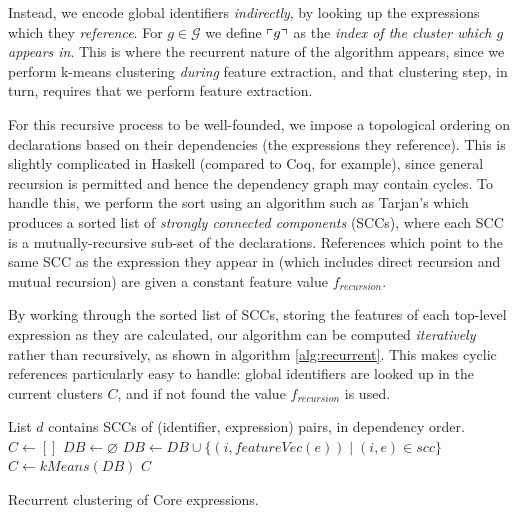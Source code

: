 \iffalse TODO: this is a novel feature compared to ML4PG, ACL2(ml), etc., right? Maybe... Emphasize either the connection to earlier work, or the novelty. \fi
Instead, we encode global identifiers \emph{indirectly}, by looking up the expressions which they \emph{reference}. For $g \in \mathcal{G}$ we define $\left\ulcorner g \right\urcorner$ as the \emph{index of the cluster which $g$ appears in}. This is where the recurrent nature of the algorithm appears, since we perform k-means clustering \emph{during} feature extraction, and that clustering step, in turn, requires that we perform feature extraction.

For this recursive process to be well-founded, we impose a topological ordering on declarations based on their dependencies (the expressions they reference). \iffalse TODO: Maybe explain a little more about topological sorting; i.e. directed graphs, etc. \fi This is slightly complicated in Haskell (compared to Coq, for example), since general recursion is permitted and hence the dependency graph may contain cycles. To handle this, we perform the sort using an algorithm such as Tarjan's which produces a sorted list of \emph{strongly connected components} (SCCs), where each SCC is a mutually-recursive sub-set of the declarations. References which point to the same SCC as the expression they appear in (which includes direct recursion and mutual recursion) are given a constant feature value $f_{recursion}$.

By working through the sorted list of SCCs, storing the features of each top-level expression as they are calculated, our algorithm can be computed \emph{iteratively} rather than recursively, as shown in algorithm \ref{alg:recurrent}. This makes cyclic references particularly easy to handle: global identifiers are looked up in the current clusters $C$, and if not found the value $f_{recursion}$ is used.

\begin{algorithm}
  \begin{algorithmic}[1]
    \Require List $d$ contains SCCs of (identifier, expression) pairs, in dependency order.
      \State $C  \gets []$
      \State $DB \gets \varnothing$
        \State $DB \gets DB \cup \{(i, featureVec(e)) \mid (i, e) \in scc\}$
        \State $C  \gets kMeans(DB)$
      \EndFor
      \Return $C$
    \EndProcedure
  \end{algorithmic}
  \caption{Recurrent clustering of Core expressions.}
  \label{alg:recurrent}
\end{algorithm}

